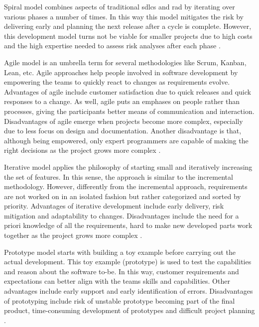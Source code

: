 Spiral model \citep{DBLP:journals/computer/Boehm88} combines aspects of traditional \glspl{sdlc} and \gls{rad} by iterating over various phases a number of times. In this way this model mitigates the risk by delivering early and planning the next release after a cycle is complete. However, this development model turns not be viable for smaller projects due to high costs and the high expertise needed to assess risk analyses after each phase \citep{sarker2015survey}.

Agile model \citep{beck2001manifesto} is an umbrella term for several methodologies like Scrum, Kanban, Lean, etc. Agile approaches help people involved in software development by empowering the teams to quickly react to changes as requirements evolve. Advantages of agile include customer satisfaction due to quick releases and quick responses to a change. As well, agile puts an emphases on people rather than processes, giving the participants better means of communication and interaction. Disadvantages of agile emerge when projects become more complex, especially due to less focus on design and documentation. Another disadvantage is that, although being empowered, only expert programmers are capable of making the right decisions as the project grows more complex \citep{DBLP:journals/jss/DingsoyrNBM12}.

Iterative model \citep{goldberg1995succeeding} applies the philosophy of starting small and iteratively increasing the set of features. In this sense, the approach is similar to the incremental methodology. However, differently from the incremental approach, requirements are not worked on in an isolated fashion but rather categorized and sorted by priority. Advantages of iterative development include early delivery, risk mitigation and adaptability to changes. Disadvantages include the need for a priori knowledge of all the requirements, hard to make new developed parts work together as the project grows more complex \citep{benediktsson2003cocomo}.


Prototype model \citep{pressman2005software} starts with building a toy example before carrying out the actual development. This toy example (prototype) is used to test the capabilities and reason about the software to-be. In this way, customer requirements and expectations can better align with the teams skills and capabilities. Other advantages include early support and early identification of errors. Disadvantages of prototyping include risk of unstable prototype becoming part of the final product, time-consuming development of prototypes and difficult project planning \citep{DBLP:conf/cicsyn/OsmaniAI14}. 



